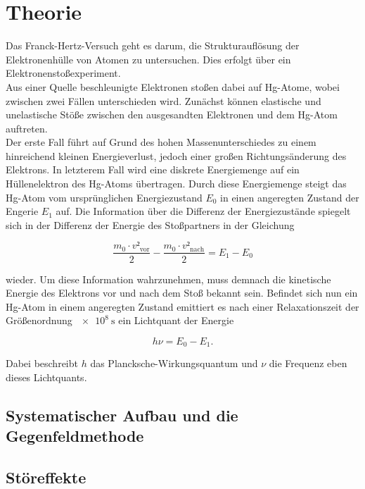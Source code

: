 \section{Theorie}
\label{sec:Theorie}

Das Franck-Hertz-Versuch geht es darum, die Strukturauflösung der Elektronenhülle von Atomen zu untersuchen.
Dies erfolgt über ein Elektronenstoßexperiment.\\
Aus einer Quelle beschleunigte Elektronen stoßen dabei auf Hg-Atome, wobei zwischen zwei Fällen unterschieden wird.
Zunächst können elastische und unelastische Stöße zwischen den ausgesandten Elektronen und dem Hg-Atom auftreten.\\
Der erste Fall führt auf Grund des hohen Massenunterschiedes zu einem hinreichend kleinen Energieverlust, jedoch einer großen Richtungsänderung des Elektrons.
In letzterem Fall wird eine diskrete Energiemenge auf ein Hüllenelektron des Hg-Atoms übertragen.
Durch diese Energiemenge steigt das Hg-Atom vom ursprünglichen Energiezustand $E_0$ in einen angeregten Zustand der Engerie $E_1$ auf.
Die Information über die Differenz der Energiezustände spiegelt sich in der Differenz der Energie des Stoßpartners in der Gleichung

\begin{equation}
\frac{m_0 \cdot v²_{\text{vor}}}{2} - \frac{m_0 \cdot v²_{\text{nach}}}{2} = E_1 - E_0 \label{eqn:1}
\end{equation}

wieder.
Um diese Information wahrzunehmen, muss demnach die kinetische Energie des Elektrons vor und nach dem Stoß bekannt sein.
Befindet sich nun ein Hg-Atom in einem angeregten Zustand emittiert es nach einer Relaxationszeit der Größenordnung $\SI{e8}{\second}$ ein Lichtquant der Energie

\begin{equation}
  h\nu = E_0 - E_1. \label{eqn:2}
\end{equation}

Dabei beschreibt $h$ das Plancksche-Wirkungsquantum und $\nu$ die Frequenz eben dieses Lichtquants.

\subsection{Systematischer Aufbau und die Gegenfeldmethode}

\subsection{Störeffekte}



















